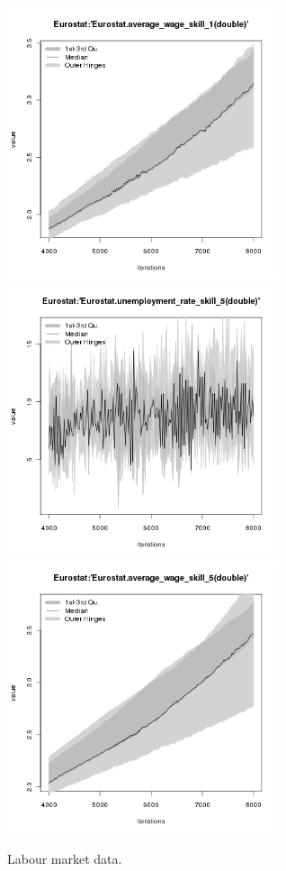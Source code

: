 \begin{figure}[H!]
\begin{minipage}{17cm}
\includegraphics[width=8cm]{./png/tax_0.08/Eurostat-average_wage_skill_1.png}\\
\includegraphics[width=8cm]{./png/tax_0.08/Eurostat-unemployment_rate_skill_5.png}
\includegraphics[width=8cm]{./png/tax_0.08/Eurostat-average_wage_skill_5.png}
\end{minipage}
\caption{Labour market data.}
\label{Figure: Labour Market}
\end{figure}


